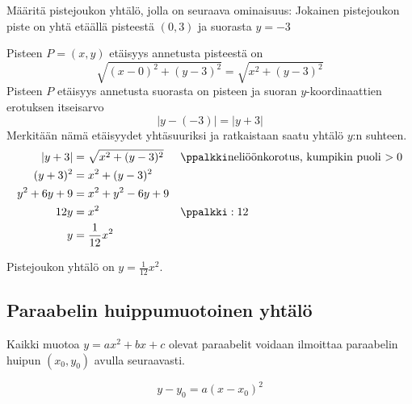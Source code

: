 \begin{esimerkki}
Määritä pistejoukon yhtälö, jolla on seuraava ominaisuus: Jokainen pistejoukon piste on yhtä etäällä pisteestä $(0, 3)$ ja suorasta $y=-3$
\begin{esimratk}
Pisteen $P=(x, y)$ etäisyys annetusta pisteestä on
\[
\sqrt{(x-0)^2+(y-3)^2}=\sqrt{x^2+(y-3)^2}
\]
Pisteen $P$ etäisyys annetusta suorasta on pisteen ja suoran $y$-koordinaattien erotuksen itseisarvo
\[
|y-(-3)| = |y+3| 
\]
Merkitään nämä etäisyydet yhtäsuuriksi ja ratkaistaan saatu yhtälö $y$:n suhteen.
\begin{align*}
|y+3| & = \sqrt{x^2+(y-3)^2} &&\ppalkki \text{neliöönkorotus, kumpikin puoli $>0$}\\
(y+3)^2  &= x^2+(y-3)^2 \\
y^2+6y+9 &=  x^2+y^2-6y+9\\
12y &= x^2 &&\ppalkki : 12\\
y &= \frac{1}{12}x^2
\end{align*}

Pistejoukon yhtälö on $y=\frac{1}{12}x^2$.

\end{esimratk}
\end{esimerkki}


\subsection{Paraabelin huippumuotoinen yhtälö}

Kaikki muotoa $y=ax^2+bx+c$ olevat paraabelit voidaan ilmoittaa paraabelin huipun $(x_0, y_0)$ avulla seuraavasti.

\[
y-y_0 = a(x-x_0)^2
\]



